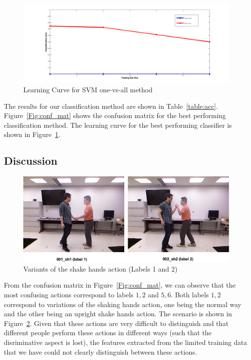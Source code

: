 \documentclass[10pt,twocolumn,letterpaper]{article}
\begin{document}
\begin{figure}[ht]
\centering
\includegraphics[scale=0.18]{svm_ovr_lc.png}
\caption{Learning Curve for SVM one-vs-all method}

\label{Fig:lc}
\end{figure}

The results for our classification method are shown in Table~\ref{table:acc}. Figure~\ref{Fig:conf_mat} shows the confusion matrix for the best performing classification method. The learning curve for the best performing classifier is shown in Figure~\ref{Fig:lc}.

\subsection*{Discussion}

\begin{figure}[ht]
\centering
\includegraphics[scale=0.3]{sh_conf.png}
\caption{Variants of the shake hands action (Labels 1 and 2)}
\label{Fig:sh_conf}
\end{figure}
From the confusion matrix in Figure~\ref{Fig:conf_mat}, we can observe that the most confusing actions correspond to labels ${1,2}$ and ${5,6}$. Both labels ${1,2}$ correspond  to variations of the shaking hands action, one being the normal way and the other being an upright shake hands action. The scenario is shown in Figure~\ref{Fig:sh_conf}. Given that these actions are very difficult to distinguish and that different people perform these actions in different ways (such that the disriminative aspect is lost), the features extracted from the limited training data that we have could not clearly distinguish between these actions. 
\end{document}
